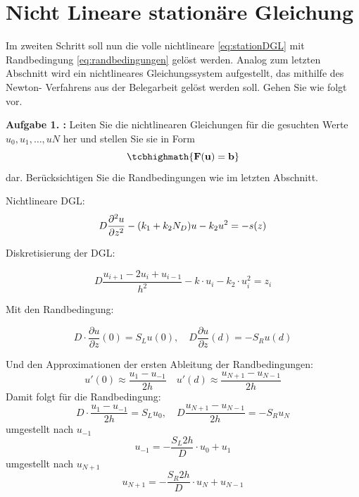 \clearpage
\section{Nicht Lineare stationäre Gleichung}
\begin{mybox}
	Im zweiten Schritt soll nun die volle nichtlineare \cref{eq:stationDGL} mit Randbedingung \cref{eq:randbedingungen} gelöst werden. Analog
	zum letzten Abschnitt wird ein nichtlineares Gleichungssystem aufgestellt, das mithilfe des Newton-
	Verfahrens aus der Belegarbeit gelöst werden soll. Gehen Sie wie folgt vor.\cite{Prof.Dr.AndreasZeiser.April2021}
\end{mybox}

\begin{mybox}
	\textbf{Aufgabe 1. :} Leiten Sie die nichtlinearen Gleichungen für die gesuchten Werte $u_0,u_1,\dots ,uN$ her und stellen Sie
	sie in Form
	\begin{equation*}
		\tcbhighmath{\mathbf{F}(\mathbf{u})=\mathbf{b}}
	\end{equation*}
dar. Berücksichtigen Sie die Randbedingungen wie im letzten Abschnitt.
\cite{Prof.Dr.AndreasZeiser.April2021}
\end{mybox}
Nichtlineare DGL:
\begin{equation}
	D\pdv[2]{u}{z}-(k_1+k_2N_D)u-k_2u^2=-s(z)
\end{equation}

Diskretisierung der DGL:

\begin{equation}
	D\frac{u_{i+1}-2u_i+u_{i-1}}{h^2}-k\cdot u_i-k_2 \cdot u_i^2=z_i
\end{equation}

Mit den Randbedingung:

\begin{equation}
	D\cdot \frac{\partial u}{\partial z}(0)=S_Lu(0),\quad D\frac{\partial u}{\partial z}(d)=-S_Ru(d)
\end{equation}

Und den Approximationen der ersten Ableitung der  Randbedingungen:
\begin{equation}
	u'(0)\approx \frac{u_1-u_{-1}}{2h} \quad u'(d)\approx \frac{u_{N+1}-u_{N-1}}{2h}
\end{equation}
Damit folgt für die Randbedingung:
\begin{equation}
	D\cdot \frac{u_1-u_{-1}}{2h}=S_Lu_0,\quad D\frac{u_{N+1}-u_{N-1}}{2h}=-S_Ru_N
\end{equation}
umgestellt nach $u_{-1}$
\begin{equation}
	u_{-1}=-\frac{S_L 2h}{D}\cdot u_0+u_1
\end{equation}
umgestellt nach $u_{N+1}$
\begin{equation}
	u_{N+1}=-\frac{S_R2h}{D}\cdot u_N+u_{N-1}
\end{equation}




